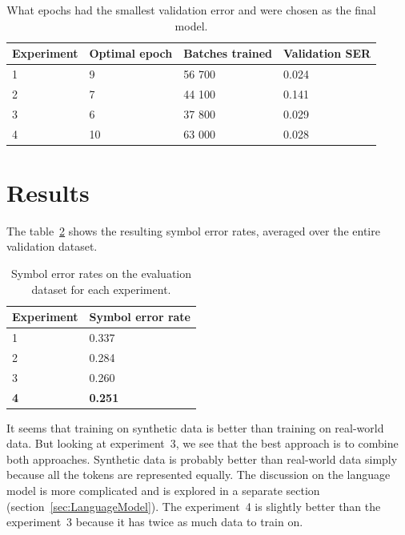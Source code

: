 \begin{table}[h] \centering
    \begin{tabular}{llll}
    \toprule
    \textbf{Experiment} & \textbf{Optimal epoch} & \textbf{Batches trained} & \textbf{Validation SER} \\
    \midrule
    1 & 9  & 56 700 & 0.024 \\
    2 & 7  & 44 100 & 0.141 \\
    3 & 6  & 37 800 & 0.029 \\
    4 & 10 & 63 000 & 0.028 \\
    \bottomrule
    \end{tabular}
    \caption{What epochs had the smallest validation error and were chosen as the final model.}
    \label{tab6:OptimalEpochs}
\end{table}

\newpage


\section{Results}
\label{sec:Results}

The table~\ref{tab6:ExperimentSER} shows the resulting symbol error rates, averaged over the entire validation dataset.

\begin{table}[h] \centering
\begin{tabular}{ll}
\toprule
\textbf{Experiment} & \textbf{Symbol error rate} \\
\midrule
1 & 0.337 \\
2 & 0.284 \\
3 & 0.260 \\
\textbf{4} & \textbf{0.251} \\
\bottomrule
\end{tabular}
\caption{Symbol error rates on the evaluation dataset for each experiment.}
\label{tab6:ExperimentSER}
\end{table}

It seems that training on synthetic data is better than training on real-world data. But looking at experiment~3, we see that the best approach is to combine both approaches. Synthetic data is probably better than real-world data simply because all the tokens are represented equally. The discussion on the language model is more complicated and is explored in a separate section (section~\ref{sec:LanguageModel}). The experiment~4 is slightly better than the experiment~3 because it has twice as much data to train on.

